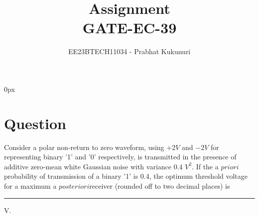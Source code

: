 \documentclass[journal,12pt,twocolumn]{IEEEtran}
\theoremstyle{remark}
\begin{document}
\parindent 0px


\vspace{3cm}

\title{Assignment\\[1ex]GATE-EC-39}
\author{EE23BTECH11034 - Prabhat Kukunuri$^{}$%
}
\maketitle
\newpage
\bigskip

\renewcommand{\thefigure}{\theenumi}
\renewcommand{\thetable}{\theenumi}
\section{Question}
Consider a polar non-return to zero  waveform, using $+2V$ and $-2V$ for representing binary '1' and '0' respectively, is transmitted in the presence of additive zero-mean white Gaussian noise with variance 0.4 $V^2$. If the a $priori$ probability of transmission of a binary '1' is 0.4, the optimum threshold voltage for a maximum a $posteriori$receiver (rounded off to two decimal places) is \rule{1.5cm}{0.15mm}V.
\end{document}
